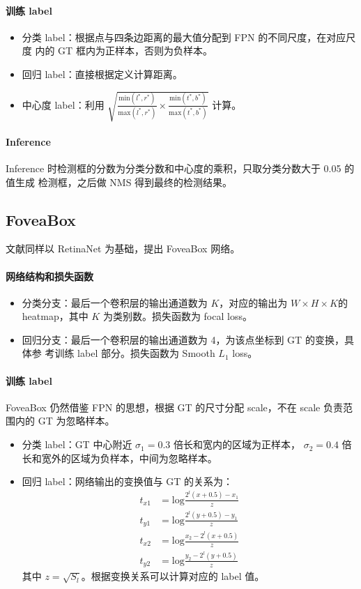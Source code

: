 \paragraph{训练 label}
\begin{itemize}
  \item 分类 label：根据点与四条边距离的最大值分配到 FPN 的不同尺度，在对应尺度
    内的 GT 框内为正样本，否则为负样本。
  \item 回归 label：直接根据定义计算距离。
  \item 中心度 label：利用 $\sqrt{\frac{\mathrm{min}(l^*,
        r^*)}{\mathrm{max}(l^*, r^*)} \times \frac{\mathrm{min}(t^*,
        b^*)}{\mathrm{max}(t^*, b^*)}}$ 计算。
\end{itemize}

\paragraph{Inference}
Inference 时检测框的分数为分类分数和中心度的乘积，只取分类分数大于 0.05 的值生成
检测框，之后做 NMS 得到最终的检测结果。

\subsection{FoveaBox}
文献同样以 RetinaNet 为基础，提出 FoveaBox 网络。 

\paragraph{网络结构和损失函数}
\begin{itemize}
  \item 分类分支：最后一个卷积层的输出通道数为 $K$，对应的输出为 $W \times H
    \times K$的 heatmap，其中 $K$ 为类别数。损失函数为 focal loss。
  \item 回归分支：最后一个卷积层的输出通道数为 4，为该点坐标到 GT 的变换，具体参
    考训练 label 部分。损失函数为 Smooth $L_1$ loss。
\end{itemize}

\paragraph{训练 label}
FoveaBox 仍然借鉴 FPN 的思想，根据 GT 的尺寸分配 scale，不在 scale 负责范围内的
GT 为忽略样本。
\begin{itemize}
  \item 分类 label：GT 中心附近 $\sigma_1=0.3$ 倍长和宽内的区域为正样本，
    $\sigma_2=0.4$ 倍长和宽外的区域为负样本，中间为忽略样本。 
  \item 回归 label：网络输出的变换值与 GT 的关系为：
    \begin{align}
      t_{x1} & = \mathrm{log} \frac{2^l (x+0.5)-x_1}{z} \\
      t_{y1} & = \mathrm{log} \frac{2^l (y+0.5)-y_1}{z} \\
      t_{x2} & = \mathrm{log} \frac{x_2 - 2^l (x+0.5)}{z} \\
      t_{y2} & = \mathrm{log} \frac{y_2 - 2^l (y+0.5)}{z}
    \end{align}
    其中 $z = \sqrt{S_l}$。根据变换关系可以计算对应的 label 值。
\end{itemize}

